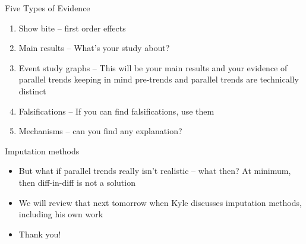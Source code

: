 \documentclass{beamer}
\begin{document}
\begin{frame}{Five Types of Evidence}

\begin{enumerate}
\item Show bite -- first order effects
\item Main results -- What's your study about?
\item Event study graphs -- This will be your main results and your evidence of parallel trends keeping in mind pre-trends and parallel trends are technically distinct
\item Falsifications -- If you can find falsifications, use them
\item Mechanisms -- can you find any explanation?  
\end{enumerate}

\end{frame}

\begin{frame}{Imputation methods}

\begin{itemize}

\item But what if parallel trends really isn't realistic -- what then? At minimum, then diff-in-diff is not a solution
\item We will review that next tomorrow when Kyle discusses imputation methods, including his own work
\item Thank you!
\end{itemize}

\end{frame}
\end{document}
